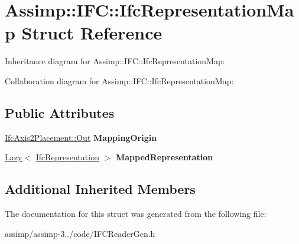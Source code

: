\hypertarget{struct_assimp_1_1_i_f_c_1_1_ifc_representation_map}{\section{Assimp\+:\+:I\+F\+C\+:\+:Ifc\+Representation\+Map Struct Reference}
\label{struct_assimp_1_1_i_f_c_1_1_ifc_representation_map}
}


Inheritance diagram for Assimp\+:\+:I\+F\+C\+:\+:Ifc\+Representation\+Map\+:


Collaboration diagram for Assimp\+:\+:I\+F\+C\+:\+:Ifc\+Representation\+Map\+:
\subsection*{Public Attributes}
\begin{DoxyCompactItemize}
\item 
\hypertarget{struct_assimp_1_1_i_f_c_1_1_ifc_representation_map_ae9c4e620491949a33b13603ffc015a4a}{\hyperlink{classboost_1_1shared__ptr}{Ifc\+Axis2\+Placement\+::\+Out} {\bfseries Mapping\+Origin}}\label{struct_assimp_1_1_i_f_c_1_1_ifc_representation_map_ae9c4e620491949a33b13603ffc015a4a}

\item 
\hypertarget{struct_assimp_1_1_i_f_c_1_1_ifc_representation_map_ab777715d4bb1f7cb97369d1ea29910aa}{\hyperlink{struct_assimp_1_1_s_t_e_p_1_1_lazy}{Lazy}$<$ \hyperlink{struct_assimp_1_1_i_f_c_1_1_ifc_representation}{Ifc\+Representation} $>$ {\bfseries Mapped\+Representation}}\label{struct_assimp_1_1_i_f_c_1_1_ifc_representation_map_ab777715d4bb1f7cb97369d1ea29910aa}

\end{DoxyCompactItemize}
\subsection*{Additional Inherited Members}


The documentation for this struct was generated from the following file\+:\begin{DoxyCompactItemize}
\item 
assimp/assimp-\/3../code/I\+F\+C\+Reader\+Gen.\+h\end{DoxyCompactItemize}
